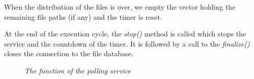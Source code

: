 When the distribution of the files is over, we empty the vector holding the remaining file paths (if any) and the timer is reset.\par
At the end of the execution cycle, the \textit{stop()} method is called which stops the service and the countdown of the timer. It is followed by a call to the \textit{finalize()} closes the connection to the file database.\par

\begin{figure}

\caption{\textit{The function of the polling service}}
\centering
{}\par

\end{figure}


